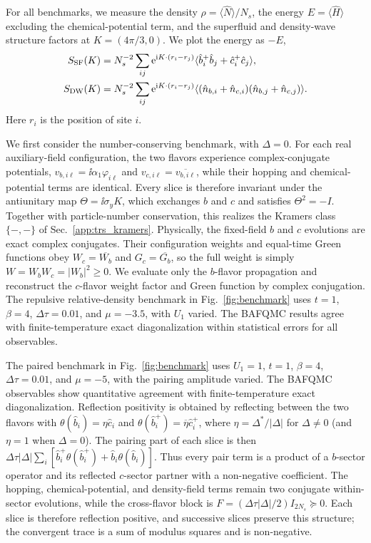 For all benchmarks, we measure the density $\rho=\langle\hat N\rangle/N_s$, the energy $E=\langle\hat H\rangle$ excluding the chemical-potential term, and the superfluid and density-wave structure factors at $K=(4\pi/3,0)$. We plot the energy as $-E$,
\begin{align}
    S_{\rm SF}(K)&=N_s^{-2}\sum_{ij}\mathrm{e}^{\mathrm{i} K\cdot(r_i-r_j)}
    \langle\hat b_i^+\hat b_j+\hat c_i^+\hat c_j\rangle,\\
    S_{\rm DW}(K)&=N_s^{-2}\sum_{ij}\mathrm{e}^{\mathrm{i} K\cdot(r_i-r_j)}
    \langle(\hat n_{b,i}+\hat n_{c,i})(\hat n_{b,j}+\hat n_{c,j})\rangle.
\end{align}
Here $r_i$ is the position of site $i$.

We first consider the number-conserving benchmark, with $\Delta=0$. For each real auxiliary-field configuration, the two flavors experience complex-conjugate potentials, $v_{b,i\ell}=\ii\alpha_1\varphi_{i\ell}$ and $v_{c,i\ell}=\overline{v_{b,i\ell}}$, while their hopping and chemical-potential terms are identical. Every slice is therefore invariant under the antiunitary map $\Theta=\ii\sigma_yK$, which exchanges $b$ and $c$ and satisfies $\Theta^2=-I$. Together with particle-number conservation, this realizes the Kramers class $\{-,-\}$ of Sec.~\ref{app:trs_kramers}. Physically, the fixed-field $b$ and $c$ evolutions are exact complex conjugates. Their configuration weights and equal-time Green functions obey $W_c=\overline{W_b}$ and $G_c=\overline{G_b}$, so the full weight is simply $W=W_bW_c=|W_b|^2\ge0$. We evaluate only the $b$-flavor propagation and reconstruct the $c$-flavor weight factor and Green function by complex conjugation. The repulsive relative-density benchmark in Fig.~\ref{fig:benchmark} uses $t=1$, $\beta=4$, $\Delta\tau=0.01$, and $\mu=-3.5$, with $U_1$ varied. The BAFQMC results agree with finite-temperature exact diagonalization within statistical errors for all observables.

The paired benchmark in Fig.~\ref{fig:benchmark} uses $U_1=1$, $t=1$, $\beta=4$, $\Delta\tau=0.01$, and $\mu=-5$, with the pairing amplitude varied. The BAFQMC observables show quantitative agreement with finite-temperature exact diagonalization. Reflection positivity is obtained by reflecting between the two flavors with $\theta(\hat b_i)=\eta\hat c_i$ and $\theta(\hat b_i^+)=\overline\eta\hat c_i^+$, where $\eta=\Delta^*/|\Delta|$ for $\Delta\ne0$ (and $\eta=1$ when $\Delta=0$). The pairing part of each slice is then $\Delta\tau|\Delta|\sum_i[\hat b_i^+\theta(\hat b_i^+)+\hat b_i\theta(\hat b_i)]$. Thus every pair term is a product of a $b$-sector operator and its reflected $c$-sector partner with a non-negative coefficient. The hopping, chemical-potential, and density-field terms remain two conjugate within-sector evolutions, while the cross-flavor block is $F=(\Delta\tau|\Delta|/2)I_{2N_s}\succeq0$. Each slice is therefore reflection positive, and successive slices preserve this structure; the convergent trace is a sum of modulus squares and is non-negative.

